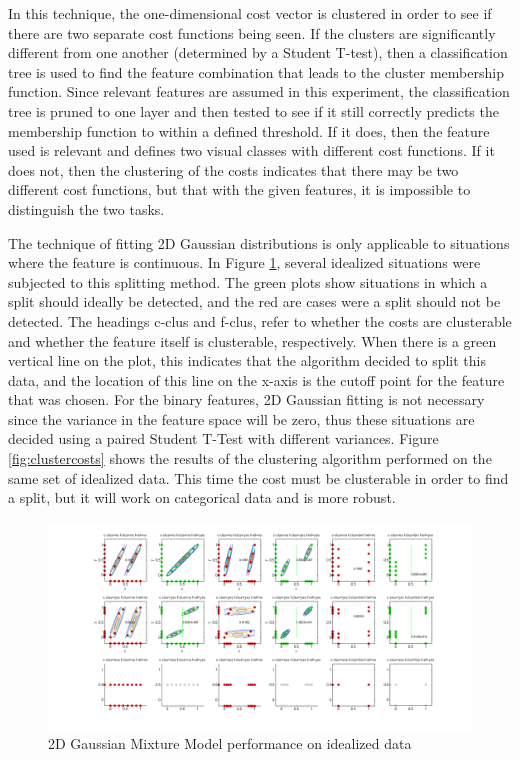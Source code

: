 \documentclass[12pt]{article}
\begin{document}
In this technique, the one-dimensional cost vector is clustered in order to see if there are two separate cost functions being seen. If the clusters are significantly different from one another (determined by a Student T-test), then a classification tree is used to find the feature combination that leads to the cluster membership function. Since relevant features are assumed in this experiment, the classification tree is pruned to one layer and then tested to see if it still correctly predicts the membership function to within a defined threshold. If it does, then the feature used is relevant and defines two visual classes with different cost functions. If it does not, then the clustering of the costs indicates that there may be two different cost functions, but that with the given features, it is impossible to distinguish the two tasks. 

The technique of fitting 2D Gaussian distributions is only applicable to situations where the feature is continuous. In Figure \ref{fig:2Dgaussians}, several idealized situations were subjected to this splitting method. The green plots show situations in which a split should ideally be detected, and the red are cases were a split should not be detected. The headings c-clus and f-clus, refer to whether the costs are clusterable and whether the feature itself is clusterable, respectively. When there is a green vertical line on the plot, this indicates that the algorithm decided to split this data, and the location of this line on the x-axis is the cutoff point for the feature that was chosen. For the binary features, 2D Gaussian fitting is not necessary since the variance in the feature space will be zero, thus these situations are decided using a paired Student T-Test with different variances. Figure \ref{fig:clustercosts} shows the results of the clustering algorithm performed on the same set of idealized data. This time the cost must be clusterable in order to find a split, but it will work on categorical data and is more robust. 


\begin{figure}[ht]
  \centerline{
  \includegraphics[width=1.5\columnwidth]{2d_gaussians.png}}
  \caption{\label{fig_label} 2D Gaussian Mixture Model performance on idealized data}
  \label{fig:2Dgaussians}
\end{figure}
\end{document}
